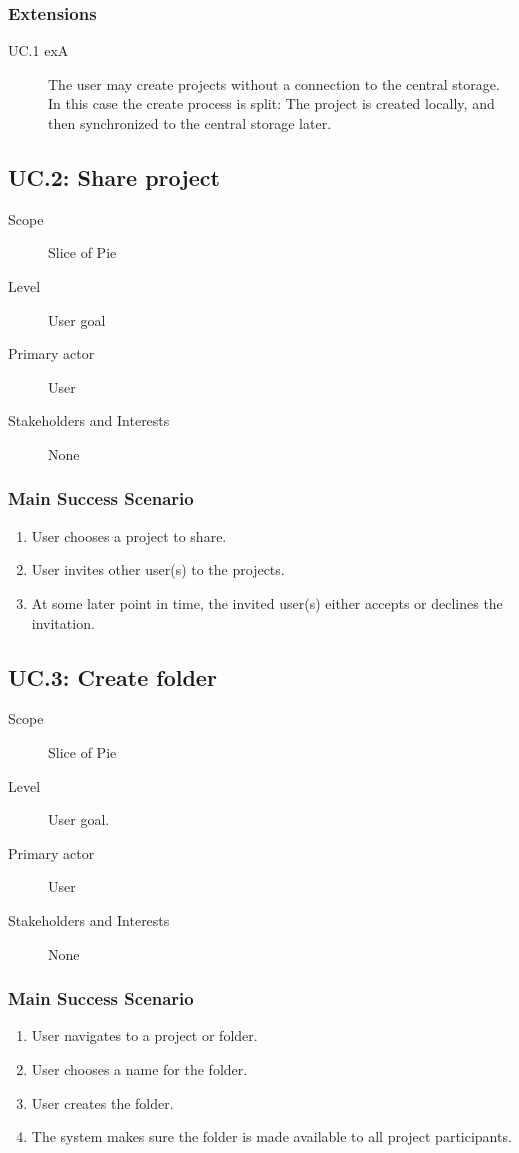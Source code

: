 \subsubsection{Extensions}
\begin{description}
    \item[UC.1 exA] The user may create projects without a connection to the central storage. In this case the create process is split: The project is created locally, and then synchronized to the central storage later.
\end{description}

\subsection{UC.2: Share project}
\begin{description}
    \item[Scope] Slice of Pie
    \item[Level] User goal
    \item[Primary actor] User
    \item[Stakeholders and Interests] None
\end{description}
    
\subsubsection{Main Success Scenario}
\begin{enumerate}
    \item User chooses a project to share.
    \item User invites other user(s) to the projects.
    \item At some later point in time, the invited user(s) either accepts or declines the invitation.
\end{enumerate}

\subsection{UC.3: Create folder}
\begin{description}
    \item[Scope] Slice of Pie
    \item[Level] User goal.
    \item[Primary actor] User
    \item[Stakeholders and Interests] None
\end{description}
    
\subsubsection{Main Success Scenario}
\begin{enumerate}
    \item User navigates to a project or folder.
    \item User chooses a name for the folder.
    \item User creates the folder.
    \item The system makes sure the folder is made available to all project participants.
\end{enumerate}
    
